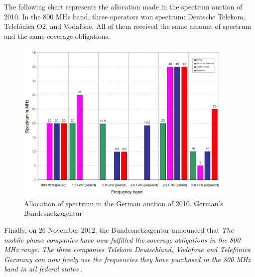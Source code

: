 
The following chart represents the allocation made in the spectrum auction of 2010. In the 800 MHz band, three operators won spectrum: Deutsche Telekom, Telefónica O2, and Vodafone. All of them received the same amount of spectrum and the same coverage obligations.



\begin{figure}[H]
	\begin{Center}
		\includegraphics[width=0.95\textwidth]{./media/image13.png}
		\caption{Allocation of spectrum in the German auction of 2010. German's Bundesnetzagentur\cite{2-32}}
	\end{Center}
\end{figure}


Finally, on 26 November 2012, the Bundesnetzagentur announced that \textit{\guillemotleft The mobile phone companies have now fulfilled the coverage obligations in the 800 MHz range. The three companies Telekom Deutschland, Vodafone and Telefónica Germany can now freely use the frequencies they have purchased in the 800 MHz band in all federal states\guillemotright } \cite{2-31}.\par
